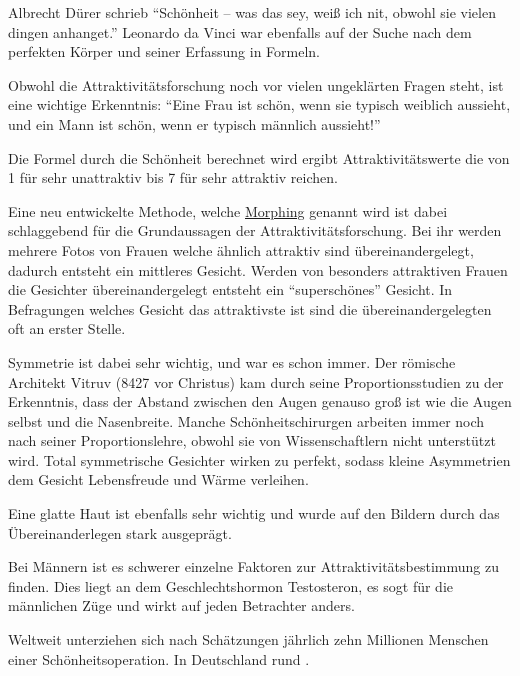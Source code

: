 Albrecht Dürer schrieb \enquote{Schönheit -- was das sey, weiß ich nit, obwohl sie vielen dingen anhanget.}
Leonardo da Vinci war ebenfalls auf der Suche nach dem perfekten Körper und seiner Erfassung in
Formeln.

Obwohl die Attraktivitätsforschung noch vor vielen ungeklärten Fragen steht, ist eine wichtige
Erkenntnis: \enquote{Eine Frau ist schön, wenn sie typisch weiblich aussieht, und ein Mann ist schön, wenn er
typisch männlich aussieht!}

Die Formel durch die Schönheit berechnet wird ergibt Attraktivitätswerte die von 1 für sehr
unattraktiv bis 7 für sehr attraktiv reichen.

Eine neu entwickelte Methode, welche
\href{http://de.wikipedia.org/wiki/Morphing}{Morphing} genannt wird ist dabei schlaggebend für die
Grundaussagen der
Attraktivitätsforschung. Bei ihr werden mehrere Fotos von Frauen welche ähnlich attraktiv sind
übereinandergelegt, dadurch entsteht ein mittleres Gesicht. Werden von besonders attraktiven Frauen
die Gesichter übereinandergelegt entsteht ein \enquote{superschönes} Gesicht. In Befragungen welches Gesicht
das attraktivste ist sind die übereinandergelegten oft an erster Stelle.

Symmetrie ist dabei sehr wichtig, und war es schon immer. Der römische Architekt Vitruv (8427 vor
Christus) kam durch seine Proportionsstudien zu der Erkenntnis, dass der Abstand zwischen den Augen
genauso groß ist wie die Augen selbst und die Nasenbreite.
Manche Schönheitschirurgen arbeiten immer noch nach seiner Proportionslehre, obwohl sie von
Wissenschaftlern nicht unterstützt wird. Total symmetrische Gesichter wirken zu perfekt,
sodass kleine Asymmetrien dem Gesicht Lebensfreude und Wärme verleihen.

Eine glatte Haut ist ebenfalls sehr wichtig und wurde auf den Bildern durch das
Übereinanderlegen stark ausgeprägt.

Bei Männern ist es schwerer einzelne Faktoren zur Attraktivitätsbestimmung zu finden.
Dies liegt an dem Geschlechtshormon Testosteron, es sogt für die männlichen Züge und wirkt auf jeden
Betrachter anders.

Weltweit unterziehen sich nach Schätzungen jährlich zehn Millionen Menschen einer
Schönheitsoperation. In Deutschland rund .

